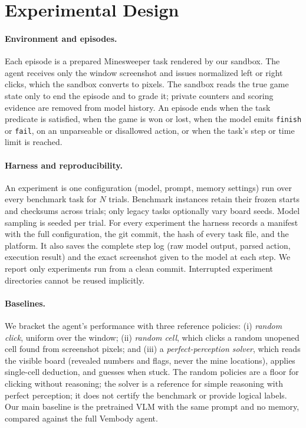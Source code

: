 
\section{Experimental Design}

\paragraph{Environment and episodes.}
Each episode is a prepared Minesweeper task rendered by our sandbox. The agent receives
only the window screenshot and issues normalized left or right clicks, which the sandbox
converts to pixels. The sandbox reads the true game state only to end the episode and to
grade it; private counters and scoring evidence are removed from model history.
An episode ends when the task predicate is satisfied, when the game is won or
lost, when the model emits \texttt{finish} or \texttt{fail}, on an unparseable or disallowed
action, or when the task's step or time limit is reached.

\paragraph{Harness and reproducibility.}
An experiment is one configuration (model, prompt, memory settings) run over every
benchmark task for $N$ trials. Benchmark instances retain their frozen starts and
checksums across trials; only legacy tasks optionally vary board seeds. Model
sampling is seeded per trial. For every experiment the harness records a manifest with the
full configuration, the git commit, the hash of every task file, and the platform. It also
saves the complete step log (raw model output, parsed action, execution result) and the
exact screenshot given to the model at each step. We report only experiments run from a
clean commit. Interrupted experiment directories cannot be reused implicitly.

\paragraph{Baselines.}
We bracket the agent's performance with three reference policies:
(i) \emph{random click}, uniform over the window;
(ii) \emph{random cell}, which clicks a random unopened cell found from screenshot pixels;
and (iii) a \emph{perfect-perception solver}, which reads the visible board (revealed
numbers and flags, never the mine locations), applies single-cell deduction, and guesses
when stuck. The random policies are a floor for clicking without reasoning; the solver is
a reference for simple reasoning with perfect perception; it does not certify the
benchmark or provide logical labels. Our main baseline is the pretrained VLM with the same
prompt and no memory, compared against the full Vembody agent.

